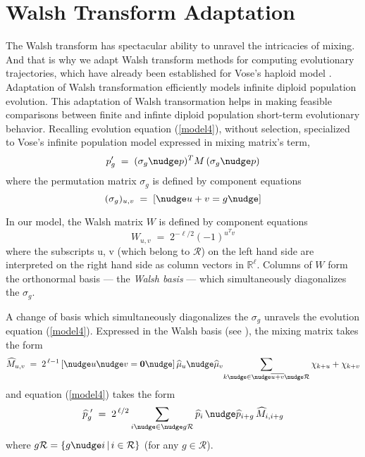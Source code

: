 \section{Walsh Transform Adaptation}
The Walsh transform has spectacular ability to unravel the intricacies of mixing. And that is why we adapt Walsh transform methods for computing evolutionary trajectories, which have already been established for Vose's haploid model \cite{Vose1999}. Adaptation of Walsh transformation efficiently models infinite diploid population evolution. This adaptation of Walsh transormation helps in making feasible comparisons between finite and infinte diploid population short-term evolutionary behavior.
Recalling evolution equation (\ref{model4}), without selection, specialized to Vose's infinite population model expressed in mixing matrix's term,
\[
p_g^\prime \; = \; (\sigma_g \nudge p)^T M \, (\sigma_g \nudge p)
\]
where the permutation matrix $\sigma_g$ is defined by component
equations
\[
(\sigma_g)_{u,v} \; = \; [\nudge u+v = g\nudge ]
\]

In our model, the Walsh matrix $W$
is defined by component equations
\[
W_{u,v} \; = \; 2^{-\ell/2} (-1)^{u^T v}
\]
where the subscripts \nudge u, \nudge v (which belong to $\mathcal{R}$) on the left hand side are interpreted on the right hand side as column vectors in $\mathbb{R}^{\ell}$.
Columns of $W$ form the orthonormal basis --- the
{\em Walsh basis\/} --- which simultaneously diagonalizes the
$\sigma_g$.

A change of basis which simultaneously diagonalizes the $\sigma_g$
unravels the evolution equation (\ref{model4}).  
Expressed in the Walsh basis (see \cite{Vose1999}), the mixing matrix
takes the form
\begin{equation}
\label{Mhat}
\widehat{M}_{u,v} \; = \; 2^{\,\ell-1} \,[\nudge u \nudge v = {\bf
    0}\nudge]\, \widehat{\mu}_u \nudge \widehat{\mu}_v \!  \sum_{k
  \nudge \in \nudge \overline{u+v} \nudge \mathcal{R}} \chi_{k + u} +
\chi_{k + v}
\end{equation}
and equation (\ref{model4}) takes the form
\begin{equation}
\label{model5}
\widehat{p}_g^{\,\,\prime} \; = \; 2^{\,\ell/2} \sum_{i \nudge \in \nudge g \mathcal{R}}
\widehat{p}_i \, \nudge \widehat{p}_{i+g} \,\widehat{M}_{i,i+g}
\end{equation}
where $g \mathcal{R} = \{g \nudge i \, | \, i \in \mathcal{R} \}$ (for
any $g \in \mathcal{R}$).

